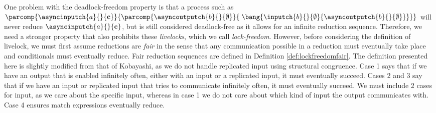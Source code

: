One problem with the deadlock-freedom property is that a process such as $\parcomp{\asyncinputch{a}{}{\mathbf{c}}}{\parcomp{\asyncoutputch{b}{}{\emptyset}}{\;\bang{\inputch{b}{}{\emptyset}{\asyncoutputch{b}{}{\emptyset}}}}}$ will never reduce $\asyncinputch{a}{}{\mathbf{c}}$, but is still considered deadlock-free as it allows for an infinite reduction sequence. Therefore, we need a stronger property that also prohibits these \textit{livelocks}, which we call \textit{lock-freedom}. However, before considering the definition of livelock, we must first assume reductions are \textit{fair} in the sense that any communication possible in a reduction must eventually take place and conditionals must eventually reduce. Fair reduction sequences are defined in Definition \ref{def:lockfreedomfair}. The definition presented here is slightly modified from that of Kobayashi, as we do not handle replicated input using structural congruence. Case 1 says that if we have an output that is enabled infinitely often, either with an input or a replicated input, it must eventually succeed. Cases 2 and 3 say that if we have an input or replicated input that tries to communicate infinitely often, it must eventually succeed. We must include 2 cases for input, as we care about the specific input, whereas in case 1 we do not care about which kind of input the output communicates with. Case 4 ensures match expressions eventually reduce.

